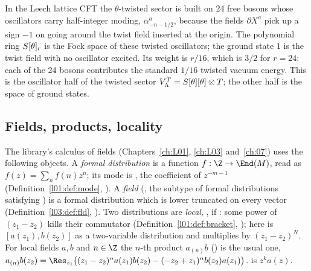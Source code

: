 \begin{physics}
In the Leech lattice CFT the $\theta$-twisted sector is built on 24 free bosons whose oscillators carry half-integer moding, $\alpha^a_{-n-1/2}$, because the fields $\partial X^a$ pick up a sign $-1$ on going around the twist field inserted at the origin. The polynomial ring $S[\theta]_r$ is the Fock space of these twisted oscillators; the ground state $1$ is the twist field with no oscillator excited. Its weight is $r/16$, which is $3/2$ for $r=24$: each of the 24 bosons contributes the standard $1/16$ twisted vacuum energy. This is the oscillator half of the twisted sector $V_\Lambda^T=S[\theta][\theta]\otimes T$; the other half is the space of ground states.
\end{physics}

\subsection{Fields, products, locality}
The library's calculus of fields (Chapters~\ref{ch:L01}, \ref{ch:L03} and~\ref{ch:07}) uses the
following objects.  A \emph{formal distribution} is a function $f:\Z\to\End(M)$, read as
$f(z)=\sum_n f(n)z^n$; its mode is , the coefficient of $z^{-m-1}$
(Definition~\ref{l01:def:mode}, ).  A \emph{field}
(, the subtype of formal distributions satisfying ) is a formal
distribution which is lower truncated on every vector (Definition~\ref{l03:def:fld},
).  Two distributions are \emph{local}, , if
: some power of $(z_1-z_2)$ kills their
commutator (Definition~\ref{l01:def:bracket}, ); here
 is $[a(z_1),b(z_2)]$ as a two-variable distribution and
 multiplies by $(z_1-z_2)^N$.  For local fields $a,b$ and $n\in\Z$ the
$n$-th product $a_{(n)}b$ () is the usual one,
$a_{(n)}b(z_2)=\Res_{z_1}\bigl((z_1-z_2)^na(z_1)b(z_2)-(-z_2+z_1)^nb(z_2)a(z_1)\bigr)$.
 is $z^k a(z)$.

